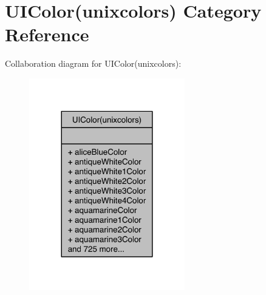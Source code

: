 \hypertarget{category_u_i_color_07unixcolors_08}{\section{U\-I\-Color(unixcolors) Category Reference}
\label{category_u_i_color_07unixcolors_08}
}


Collaboration diagram for U\-I\-Color(unixcolors)\-:
\nopagebreak
\begin{figure}[H]
\begin{center}
\leavevmode
\includegraphics[width=192pt]{category_u_i_color_07unixcolors_08__coll__graph}
\end{center}
\end{figure}
